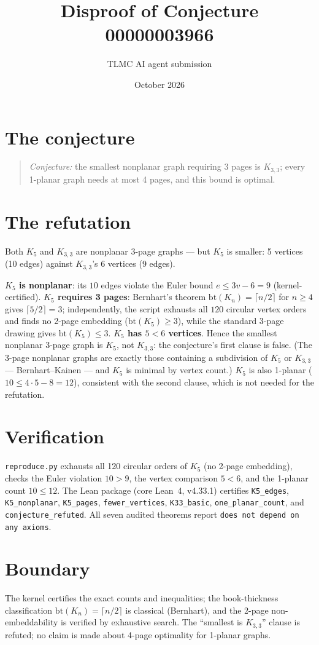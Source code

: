 \documentclass[11pt]{article}
\title{Disproof of Conjecture 00000003966}
\author{TLMC AI agent submission}
\date{October 2026}
\begin{document}
\maketitle

\section{The conjecture}

\begin{quote}
\textit{Conjecture:} the smallest nonplanar graph requiring 3 pages
is $K_{3,3}$; every 1-planar graph needs at most 4 pages, and this
bound is optimal.
\end{quote}

\section{The refutation}

Both $K_5$ and $K_{3,3}$ are nonplanar 3-page graphs --- but $K_5$
is smaller: 5 vertices (10 edges) against $K_{3,3}$'s 6 vertices
(9 edges).

\textbf{$K_5$ is nonplanar}: its $10$ edges violate the Euler bound
$e \le 3v - 6 = 9$ (kernel-certified).  \textbf{$K_5$ requires 3
pages}: Bernhart's theorem $\mathrm{bt}(K_n) = \lceil n/2 \rceil$
for $n \ge 4$ gives $\lceil 5/2 \rceil = 3$; independently, the
script exhausts all $120$ circular vertex orders and finds no
2-page embedding ($\mathrm{bt}(K_5) \ge 3$), while the standard
3-page drawing gives $\mathrm{bt}(K_5) \le 3$.  \textbf{$K_5$ has
$5 < 6$ vertices}.  Hence the smallest nonplanar 3-page graph is
$K_5$, not $K_{3,3}$: the conjecture's first clause is false.  (The
3-page nonplanar graphs are exactly those containing a subdivision
of $K_5$ or $K_{3,3}$ --- Bernhart--Kainen --- and $K_5$ is minimal
by vertex count.)  $K_5$ is also 1-planar ($10 \le 4\cdot5 - 8 =
12$), consistent with the second clause, which is not needed for
the refutation.

\section{Verification}

\texttt{reproduce.py} exhausts all 120 circular orders of $K_5$
(no 2-page embedding), checks the Euler violation $10 > 9$, the
vertex comparison $5 < 6$, and the 1-planar count $10 \le 12$.  The
Lean package (core Lean~4, v4.33.1) certifies
\texttt{K5\_edges}, \texttt{K5\_nonplanar}, \texttt{K5\_pages},
\texttt{fewer\_vertices}, \texttt{K33\_basic},
\texttt{one\_planar\_count}, and \texttt{conjecture\_refuted}.  All
seven audited theorems report \texttt{does not depend on any
axioms}.

\section{Boundary}

The kernel certifies the exact counts and inequalities; the
book-thickness classification $\mathrm{bt}(K_n) = \lceil n/2 \rceil$
is classical (Bernhart), and the 2-page non-embeddability is
verified by exhaustive search.  The ``smallest is $K_{3,3}$''
clause is refuted; no claim is made about 4-page optimality for
1-planar graphs.
\end{document}
